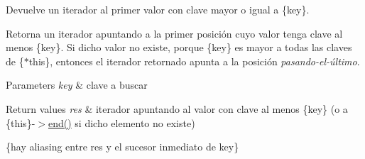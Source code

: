 \-Devuelve un iterador al primer valor con clave mayor o igual a \{key\}. 

\-Retorna un iterador apuntando a la primer posición cuyo valor tenga clave al menos \{key\}. \-Si dicho valor no existe, porque \{key\} es mayor a todas las claves de \{$\ast$this\}, entonces el iterador retornado apunta a la posición {\itshape pasando-\/el-\/último\/}.


\begin{DoxyParams}{\-Parameters}
{\em key} & clave a buscar \\
\hline
\end{DoxyParams}

\begin{DoxyRetVals}{\-Return values}
{\em res} & iterador apuntando al valor con clave al menos \{key\} (o a \{this\}-\/$>$\hyperlink{classaed2_1_1map_a76023e6a56cb625513e1b5ea028bf983}{end()} si dicho elemento no existe)\\
\hline
\end{DoxyRetVals}
\{hay aliasing entre res y el sucesor inmediato de key\}

